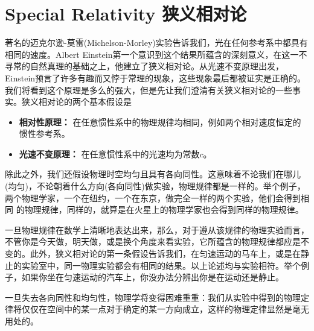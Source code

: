 



\chapter[狭义相对论]{Special Relativity 狭义相对论}
\label{chap2} 
著名的迈克尔逊-莫雷(Michelson-Morley)实验告诉我们，光在任何参考系中都具有相同的速度。Albert Einstein第一个意识到这个结果所蕴含的深刻意义，在这一不寻常的自然真理的基础之上，他建立了狭义相对论。从光速不变原理出发，Einstein预言了许多有趣而又悖于常理的现象，这些现象最后都被证实是正确的。我们将看到这个原理是多么的强大，但是先让我们澄清有关狭义相对论的一些事实。狭义相对论的两个基本假设是
\begin{itemize}
	\item {\bf{相对性原理：}} 在任意惯性系中的物理规律均相同，例如两个相对速度恒定的惯性参考系。
	\item {\bf{光速不变原理：}} 在任意惯性系中的光速均为常数$c$。
\end{itemize}
除此之外，我们还假设物理时空均匀且具有各向同性。这意味着不论我们在哪儿(均匀)，不论朝着什么方向(各向同性)做实验，物理规律都是一样的。举个例子，两个物理学家，一个在纽约，一个在东京，做完全一样的两个实验，他们会得到相同
  的物理规律，同样的，就算是在火星上的物理学家也会得到同样的物理规律。

一旦物理规律在数学上清晰地表达出来，那么，对于遵从该规律的物理实验而言，不管你是今天做，明天做，或是换个角度来看实验，它所蕴含的物理规律都应是不变的。此外，狭义相对论的第一条假设告诉我们，在匀速运动的马车上，或是在静止的实验室中，同一物理实验都会有相同的结果。以上论述均与实验相符。举个例子，如果你坐在匀速运动的汽车上，你没办法分辨出你是在运动还是静止。

一旦失去各向同性和均匀性，物理学将变得困难重重：我们从实验中得到的物理定律将仅仅在空间中的某一点对于确定的某一方向成立，这样的物理定律显然是毫无用处的。

